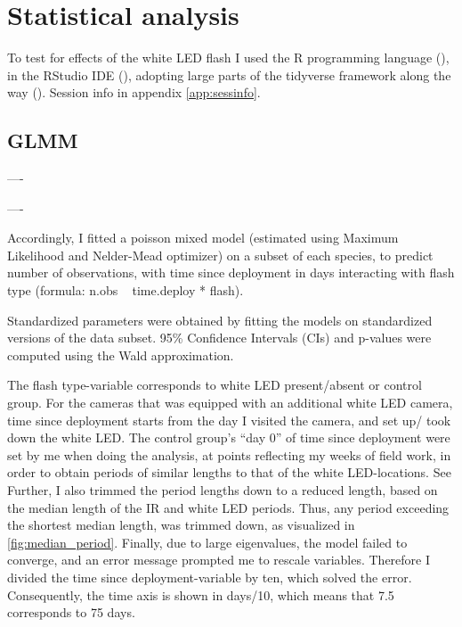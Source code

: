 \section{Statistical analysis} %

To test for effects of the white LED flash I used the R programming language (\cite{RCoreTeam2020}), in the RStudio IDE (\cite{RStudioTeam2020a}), adopting large parts of the tidyverse framework along the way (\cite{tidyverse}). Session info in appendix \ref{app:sessinfo}. %




	\subsection*{GLMM}
----

----


Accordingly, I fitted a poisson mixed model (estimated using Maximum Likelihood and Nelder-Mead optimizer) on a subset of each species, to predict number of observations, with time since deployment in days interacting with flash type (formula: n.obs ~ time.deploy * flash).

Standardized parameters were obtained by fitting the models on standardized versions of the data subset. 95\% Confidence Intervals (CIs) and p-values were computed using the Wald approximation. 

The flash type-variable corresponds to white LED present/absent or control group.
For the cameras that was equipped with an additional white LED camera, time since deployment starts from the day I visited the camera, and set up/ took down the white LED.
The control group’s “day 0” of time since deployment were set by me when doing the analysis, at points reflecting my weeks of field work, in order to obtain periods of similar lengths to that of the white LED-locations. See 
Further, I also trimmed the period lengths down to a reduced length, based on the median length of the IR and white LED periods. Thus, any period exceeding the shortest median length, was trimmed down, as visualized in \ref{fig:median_period}.
Finally, due to large eigenvalues, the model failed to converge, and an error message prompted me to rescale variables.
Therefore I divided the time since deployment-variable by ten, which solved the error.
Consequently, the time axis is shown in days/10, which means that 7.5 corresponds to 75 days.


